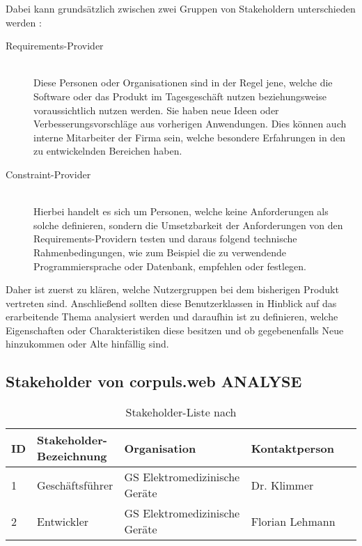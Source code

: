 Dabei kann grundsätzlich zwischen zwei Gruppen von Stakeholdern unterschieden werden \cite{Leffingwell.2011}:
\begin{description}
\item [Requirements-Provider] \hfill \\
Diese Personen oder Organisationen sind in der Regel jene, welche die Software oder das Produkt im Tagesgeschäft nutzen beziehungsweise voraussichtlich nutzen werden. Sie haben neue Ideen oder Verbesserungsvorschläge aus vorherigen Anwendungen. Dies können auch interne Mitarbeiter der Firma sein, welche besondere Erfahrungen in den zu entwickelnden Bereichen haben. %
\item [Constraint-Provider] \hfill \\
Hierbei handelt es sich um Personen, welche keine Anforderungen als solche definieren, sondern die Umsetzbarkeit der Anforderungen von den Requirements-Providern testen und daraus folgend technische Rahmenbedingungen, wie zum Beispiel die zu verwendende  Programmiersprache oder Datenbank, empfehlen oder festlegen.
\end{description}

Daher ist zuerst zu klären, welche Nutzergruppen bei dem bisherigen Produkt vertreten sind. Anschließend sollten diese Benutzerklassen in Hinblick auf das erarbeitende Thema analysiert werden und daraufhin ist zu definieren, welche Eigenschaften oder Charakteristiken diese besitzen und ob gegebenenfalls Neue hinzukommen oder Alte hinfällig sind. 

\subsection{Stakeholder von corpuls.web ANALYSE}

\begin{table}
\centering
\setlength{\extrarowheight}{4pt}
\begin{tabular}{ | p{0.05\linewidth} | p{0.2\linewidth} | p{0.4\linewidth} | p{0.35\linewidth} |}
  \hline
  \textbf{ID} & \textbf{Stakeholder-Bezeichnung} & \textbf{Organisation} & \textbf{Kontaktperson}
  \\\hline
  1			& Geschäftsführer & GS Elektromedizinische Geräte & Dr. Klimmer
  \\\hline  
  2			& Entwickler & GS Elektromedizinische Geräte & Florian Lehmann
  \\\hline
\end{tabular} 
  \caption[Stakeholder-Liste]{Stakeholder-Liste nach \cite[S. 85]{Bergsmann.2018}}
  \label{tbl:Stakeholder-Liste}
\end{table}



